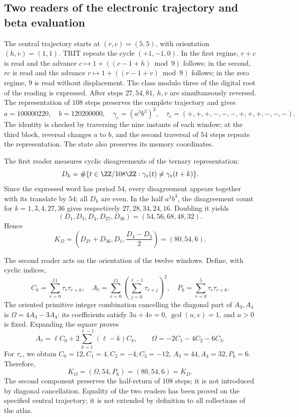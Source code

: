 \subsection{Two readers of the electronic trajectory and beta evaluation}
\label{vi:dep:beta}

The central trajectory starts at \((r,c)=(5,5)\), with
orientation \((h,v)=(1,1)\). TRIT repeats the cycle \((+1,-1,0)\).
In the first regime, \(r+c\) is read and the advance
\(c\mapsto1+((c-1+h)\bmod9)\) follows; in the second, \(rc\) is read and
the advance \(r\mapsto1+((r-1+v)\bmod9)\) follows; in the zero
regime, \(9\) is read without displacement. The class modulo
three of the digital root of the reading is expressed. After steps \(27,54,81\),
\(h,v\) are simultaneously reversed. The representation of \(108\)
steps preserves the complete trajectory and gives
\begin{equation}
 a=100000220,\quad b=120200000,\quad
 \gamma_e=(a^3b^3)^2,
 \quad\tau_e=(+,+,+,-,-,-,+,+,+,-,-,-).
 \label{vi:dep:trayectoria-electron}
\end{equation}
The identity is checked by traversing the nine instants of each
window; at the third block, reversal changes \(a\) to \(b\),
and the second traversal of \(54\) steps repeats the representation.
The state also preserves its memory coordinates.

The first reader measures cyclic disagreements of the ternary representation:
\[
 D_k=\#\{t\in\ZZ/108\ZZ:\gamma_e(t)\ne\gamma_e(t+k)\}.
\]
Since the expressed word has period \(54\), every disagreement
appears together with its translate by \(54\); all \(D_k\) are even.
In the half \(a^3b^3\), the disagreement count for
\(k=1,3,4,27,36\) gives respectively \(27,28,34,24,16\).
Doubling it yields
\[
 (D_1,D_3,D_4,D_{27},D_{36})=(54,56,68,48,32).
\]
Hence
\begin{equation}
 K_D=\left(D_{27}+D_{36},D_1,\frac{D_4-D_3}{2}\right)
     =(80,54,6).
 \label{vi:dep:KD}
\end{equation}

The second reader acts on the orientation of the twelve windows.
Define, with cyclic indices,
\[
 C_k=\sum_{r=0}^{11}\tau_r\tau_{r+k},\quad
 A_\ell=\sum_{r=0}^{11}\left(\sum_{j=0}^{\ell-1}\tau_{r+j}\right)^2,
 \quad P_6=\sum_{r=0}^{5}\tau_r\tau_{r+6}.
\]
The oriented primitive integer combination cancelling the diagonal part
of \(A_3,A_4\) is \(\Omega=4A_3-3A_4\): its coefficients
satisfy \(3u+4v=0\), \(\gcd(u,v)=1\), and \(u>0\) is fixed.
Expanding the square proves
\[
 A_\ell=\ell C_0+
     2\sum_{k=1}^{\ell-1}(\ell-k)C_k,
 \qquad\Omega=-2C_1-4C_2-6C_3.
\]
For \(\tau_e\), we obtain
\(C_0=12,C_1=4,C_2=-4,C_3=-12\),
\(A_3=44,A_4=32,P_6=6\). Therefore,
\begin{equation}
 K_\Omega=(\Omega,54,P_6)=(80,54,6)=K_D.
 \label{vi:dep:KOmega}
\end{equation}
The second component preserves the half-return of \(108\) steps;
it is not introduced by diagonal cancellation. Equality of the two
readers has been proved on the specified central trajectory;
it is not extended by definition to all collections of the atlas.

